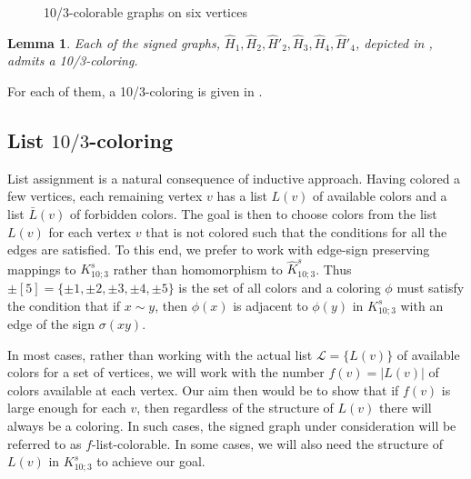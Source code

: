 \documentclass[11pt,a4paper]{article}
\makeatletter
\renewenvironment{proof}[1][\proofname]{\par
	\pushQED{\qed}%
	\normalfont \topsep6\p@\@plus6\p@\relax
	\trivlist
	\item[\hskip\labelsep
	\bfseries
	#1\@addpunct{.}]\ignorespaces
}{%
	\popQED\endtrivlist\@endpefalse
}
\newtheorem{lemma}[theorem]{Lemma}
\theoremstyle{definition}
\makeatother
\begin{document}
\begin{figure}[h!]
\begin{minipage}[t]{0.32\textwidth}
			\caption*{$\widehat{H}'_4$}
		\end{minipage}
		\caption{10/3-colorable graphs on six vertices}
		\label{fig:10/3-colorable graphs}
	\end{figure}
	\begin{lemma} \label{lem:10/3-colorable_graphs}
		Each of the signed graphs, $\widehat{H}_1, \widehat{H}_2, \widehat{H}'_2, \widehat{H}_3, \widehat{H}_4, \widehat{H}'_4$, depicted in , admits a 10/3-coloring.
	\end{lemma}
	\begin{proof}
		For each of them, a 10/3-coloring is given in .
	\end{proof}
	
	\subsection{List $10/3$-coloring}
	
	List assignment is a natural consequence of inductive approach. Having colored a few vertices, each remaining vertex $v$ has a list $L(v)$ of available colors and a list $\bar{L}(v)$ of forbidden colors. The goal is then to choose colors from the list $L(v)$ for each vertex $v$ that is not colored such that the conditions for all the edges are satisfied. To this end, we prefer to work with edge-sign preserving mappings to $K_{10;3}^s$ rather than homomorphism to $\widehat{K}_{10;3}^s$. Thus $\pm[5]=\{ \pm 1, \pm 2, \pm 3, \pm 4, \pm 5\}$ is the set of all colors and a coloring $\phi$ must satisfy the condition that if $x\sim y$, then $\phi(x)$ is adjacent to $\phi(y)$ in $K_{10;3}^s$ with an edge of the sign $\sigma(xy)$.
	
	In most cases, rather than working with the actual list $\mathcal{L}=\{L(v)\}$ of available colors for a set of vertices, we will work with the number $f(v)=|L(v)|$ of colors available at each vertex. Our aim then would be to show that if $f(v)$ is large enough for each $v$, then regardless of the structure of $L(v)$ there will always be a coloring. In such cases, the signed graph under consideration will be referred to as $f$-list-colorable. In some cases, we will also need the structure of $L(v)$ in $K_{10;3}^s$ to achieve our goal. 
		
\end{document}

